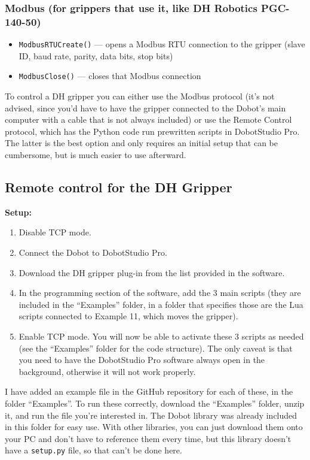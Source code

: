 \documentclass[11pt,a4paper]{article}
\newcommand{\code}[1]{\lstinline[style=inline]{#1}}
\begin{document}
\subsubsection*{Modbus (for grippers that use it, like DH Robotics PGC-140-50)}
\begin{itemize}[leftmargin=1.2cm]
    \item \code{ModbusRTUCreate()} --- opens a Modbus RTU connection to the gripper (slave ID, baud rate, parity, data bits, stop bits)
    \item \code{ModbusClose()} --- closes that Modbus connection
\end{itemize}

To control a DH gripper you can either use the Modbus protocol (it's not advised, since you'd have to have the gripper connected to the Dobot's main computer with a cable that is not always included) or use the Remote Control protocol, which has the Python code run prewritten scripts in DobotStudio Pro. The latter is the best option and only requires an initial setup that can be cumbersome, but is much easier to use afterward.

\subsection*{Remote control for the DH Gripper}

\textbf{Setup:}

\begin{enumerate}[leftmargin=1.2cm]
    \item Disable TCP mode.
    \item Connect the Dobot to DobotStudio Pro.
    \item Download the DH gripper plug-in from the list provided in the software.
    \item In the programming section of the software, add the 3 main scripts (they are included in the ``Examples'' folder, in a folder that specifies those are the Lua scripts connected to Example 11, which moves the gripper).
    \item Enable TCP mode. You will now be able to activate these 3 scripts as needed (see the ``Examples'' folder for the code structure). The only caveat is that you need to have the DobotStudio Pro software always open in the background, otherwise it will not work properly.
\end{enumerate}

I have added an example file in the GitHub repository for each of these, in the folder ``Examples''. To run these correctly, download the ``Examples'' folder, unzip it, and run the file you're interested in. The Dobot library was already included in this folder for easy use. With other libraries, you can just download them onto your PC and don't have to reference them every time, but this library doesn't have a \code{setup.py} file, so that can't be done here.
\end{document}
